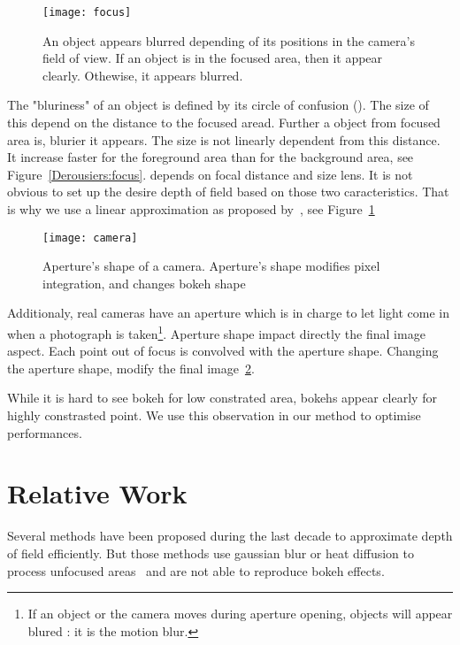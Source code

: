 	\begin{figure}[htb]\centering
	\texttt{[image: focus]}
	\caption{An object appears blurred depending of its positions in the camera's field of view. 
If an object is in the focused area, then it appear clearly. Othewise, it appears blurred. }
	\label{DeRousiers:focus}
	\end{figure}


The "bluriness" of an object is defined by its circle of confusion (\coc). The size of this \coc depend on the distance to the focused aread. Further a object from focused area is, blurier it appears. The \coc size is not linearly dependent from this distance. It increase faster for the foreground area than for the background area, see Figure~\ref{Derousiers:focus}. \coc depends on focal distance and size lens. It is not obvious to set up the desire depth of field based on those two caracteristics. That is why we use a linear approximation as proposed by~\cite{Hammon07}, see Figure~\ref{DeRousiers:focus}

	\begin{figure}[htb]\centering
	\texttt{[image: camera]}
	\caption{Aperture's shape of a camera. Aperture's shape modifies pixel integration, and changes bokeh shape }
	\label{DeRousiers:camera}
	\end{figure}

Additionaly, real cameras have an aperture which is in charge to let light come in when a photograph is taken\footnote{If an object or the camera moves during aperture opening, objects will appear blured : it is the motion blur.}. Aperture shape impact directly the final image aspect. Each point out of focus is convolved with the aperture shape. Changing the aperture shape, modify the final image~\ref{DeRousiers:camera}.

While it is hard to see bokeh for low constrated area, bokehs appear clearly for highly constrasted point. We use this observation in our method to optimise performances.

\section{Relative Work}\label{Derousiers:RelativeWork}

Several methods have been proposed during the last decade to approximate depth of field efficiently. But those methods use gaussian blur or heat diffusion to process unfocused areas~\cite{Kosloff07,Hammon07} and are not able to reproduce bokeh effects.

